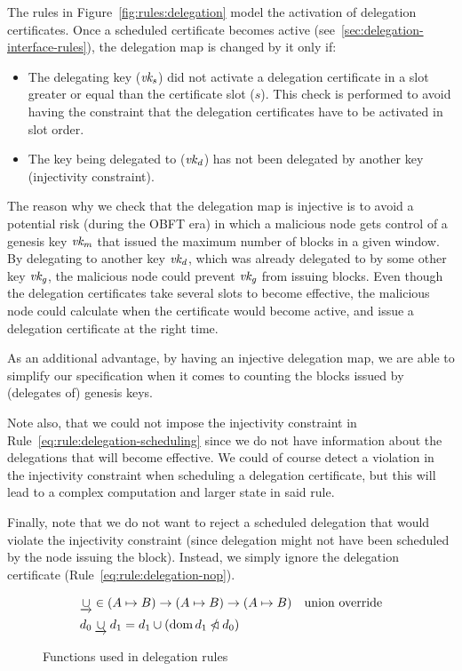 The rules in Figure~\ref{fig:rules:delegation} model the activation of
delegation certificates. Once a scheduled certificate becomes active
(see~\cref{sec:delegation-interface-rules}), the delegation map is changed by
it only if:
\begin{itemize}
\item The delegating key ($\mathit{vk_s}$) did not activate a delegation
  certificate in a slot greater or equal than the certificate slot ($s$). This
  check is performed to avoid having the constraint that the delegation
  certificates have to be activated in slot order.
\item The key being delegated to ($\mathit{vk_d}$) has not been delegated by
  another key (injectivity constraint).
\end{itemize}
The reason why we check that the delegation map is injective is to avoid a
potential risk (during the OBFT era) in which a malicious node gets control of
a genesis key $\mathit{vk_m}$ that issued the maximum number of blocks in a given
window. By delegating to another key $\mathit{vk_d}$, which was already delegated to
by some other key $\mathit{vk_g}$, the malicious node could prevent $\mathit{vk_g}$
from issuing blocks. Even though the delegation certificates take several slots
to become effective, the malicious node could calculate when the certificate
would become active, and issue a delegation certificate at the right time.

As an additional advantage, by having an injective delegation map, we are able
to simplify our specification when it comes to counting the blocks issued by
(delegates of) genesis keys.

Note also, that we could not impose the injectivity constraint in
Rule~\ref{eq:rule:delegation-scheduling} since we do not have information about
the delegations that will become effective. We could of course detect a
violation in the injectivity constraint when scheduling a delegation
certificate, but this will lead to a complex computation and larger state in
said rule.

Finally, note that we do not want to reject a scheduled delegation that would
violate the injectivity constraint (since delegation might not have been
scheduled by the node issuing the block). Instead, we simply ignore the
delegation certificate (Rule~\ref{eq:rule:delegation-nop}).

\begin{figure}[htb]
  \begin{align*}
    & \mathbin{\underrightarrow\cup} \in (A \mapsto B) \to (A \mapsto B) \to (A \mapsto B)
    & \text{union override}\\
    & d_0 \mathbin{\underrightarrow\cup} d_1 = d_1 \cup (\operatorname{dom} d_1 \mathbin{\slashed{\lhd}} d_0)
  \end{align*}
  \caption{Functions used in delegation rules}
  \label{fig:funcs:delegation}
\end{figure}

